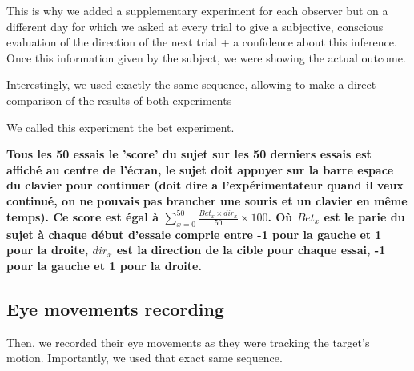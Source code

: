 \documentclass[profile,final,english, draft]{article}%
\begin{document}
This is why we added a supplementary experiment for each observer but on a different day for which we asked at every trial to give a subjective, conscious evaluation of the direction of the next trial + a confidence about this inference. Once this information given by the subject, we were showing the actual outcome.

Interestingly, we used exactly the same sequence, allowing to make a direct comparison of the results of both experiments

We called this experiment the bet experiment.


\textbf{Tous les 50 essais le 'score' du sujet sur les 50 derniers essais est affiché au centre de l'écran, le sujet doit appuyer sur la barre espace du clavier pour continuer (doit dire a l'expérimentateur quand il veux continué, on ne pouvais pas brancher une souris et un clavier en même temps). Ce score est égal à $\sum_{x=0}^{50} \frac{Bet_{x} \times dir_x}{50} \times 100$. Où $Bet_x$ est le parie du sujet à chaque début d'essaie comprie entre -1 pour la gauche et 1 pour la droite, $dir_x$ est la direction de la cible pour chaque essai, -1 pour la gauche et 1 pour la droite.}




\subsection{Eye movements recording}
Then, we recorded their eye movements as they were tracking the target's motion. Importantly, we used that exact same sequence.

\end{document}
